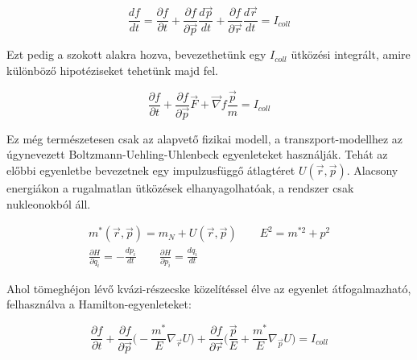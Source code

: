 \documentclass[a4paper,12pt]{article}
\begin{document}
\begin{equation}
	\frac{df}{dt} = \frac{\partial f}{\partial t} + \frac{\partial f}{\partial \vec{p}}\frac{d\vec{p}}{dt} + \frac{\partial f}{\partial \vec{r}}\frac{d\vec{r}}{dt} = I_{coll}
\end{equation}

\vspace{5mm}

\par Ezt pedig a szokott alakra hozva, bevezethetünk egy $I_{coll}$ ütközési integrált, amire különböző hipotéziseket tehetünk majd fel.

\vspace{5mm}

\begin{equation}
	\frac{\partial f}{\partial t} + \frac{\partial f}{\partial \vec{p}}\vec{F} + \vec{\nabla}f\frac{\vec{p}}{m} = I_{coll}
\end{equation}

\vspace{5mm}

\par Ez még természetesen csak az alapvető fizikai modell, a transzport-modellhez az úgynevezett Boltzmann-Uehling-Uhlenbeck egyenleteket használják. Tehát az előbbi egyenletbe bevezetnek egy impulzusfüggő átlagtéret $U(\vec{r}, \vec{p})$. Alacsony energiákon a rugalmatlan ütközések elhanyagolhatóak, a rendszer csak nukleonokból áll. 

\vspace{5mm}
	
\begin{gather}
	m^{*}(\vec{r}, \vec{p}) = m_{N} + U(\vec{r}, \vec{p}) \quad \quad E^{2} = m^{* 2} + p^{2} \\ 
	\frac{\partial H}{\partial q_{i}} = -\frac{dp_{i}}{dt} \quad \quad \frac{\partial H}{\partial p_{i}} =\frac{dq_{i}}{dt}
\end{gather}

\vspace{5mm}
	
\par Ahol tömeghéjon lévő kvázi-részecske közelítéssel élve az egyenlet átfogalmazható, felhasználva a Hamilton-egyenleteket:

\vspace{5mm}

\begin{equation} \label{BUU-eq:1}
	\frac{\partial f}{\partial t} + \frac{\partial f}{\partial \vec{p}}\Big(-\frac{m^{*}}{E}\nabla_{\vec{r}}U\Big) + \frac{\partial f}{\partial \vec{r}}\Big(\frac{\vec{p}}{E}+\frac{m^{*}}{E}\nabla_{\vec{p}}U\Big) = I_{coll}
\end{equation}
\end{document}
